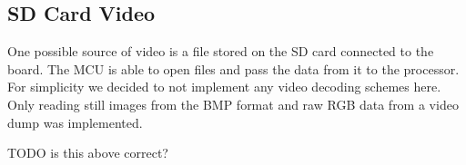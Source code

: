 \subsection{SD Card Video}
One possible source of video is a file stored on the SD card connected to the board.
The MCU is able to open files and pass the data from it to the processor.
For simplicity we decided to not implement any video decoding schemes here.
Only reading still images from the BMP format and raw RGB data from a video dump was implemented.

TODO is this above correct?
